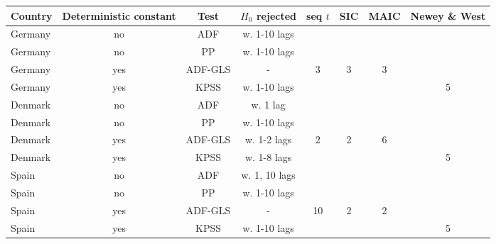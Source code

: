 \begin{tabular}{lccccccc}
\toprule
Country &Deterministic constant
            &Test   &$H_0$ rejected &seq $t$&SIC&MAIC &Newey \& West\\
\midrule
Germany &no &ADF    &w. 1-10 lags  &       &   &     &             \\
Germany &no &PP     &w. 1-10 lags   &       &   &     &             \\
Germany &yes&ADF-GLS&-              &3      &3  &3    &             \\
Germany &yes&KPSS   &w. 1-10 lags   &       &   &     &5            \\
\midrule
Denmark &no &ADF    &w. 1 lag       &       &   &     &             \\
Denmark &no &PP     &w. 1-10 lags   &       &   &     &             \\
Denmark &yes&ADF-GLS&w. 1-2 lags    &2      &2  &6    &             \\
Denmark &yes&KPSS   &w. 1-8 lags    &       &   &     &5            \\
\midrule
Spain   &no &ADF    &w. 1, 10 lags  &       &   &     &             \\
Spain   &no &PP     &w. 1-10 lags   &       &   &     &             \\
Spain   &yes&ADF-GLS&-              &10     &2  &2    &             \\
Spain   &yes&KPSS   &w. 1-10 lags   &       &   &     &5            \\
\bottomrule \end{tabular} \\ 
%
%
%     
